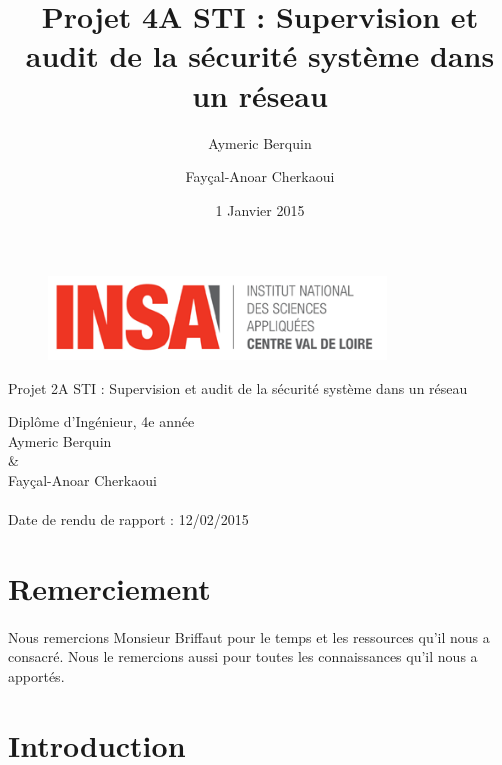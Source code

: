 \documentclass[11pt,a4paper,titlepage, oneside]{article}
\title{Projet 4A STI : Supervision et audit de la sécurité système dans un réseau}
\author{Aymeric Berquin \and Fayçal-Anoar Cherkaoui}
\date{1 Janvier 2015}
\begin{document}
\begin{titlepage}
 \thispagestyle{empty}
\begin{figure}[h]
  \centering
  \includegraphics[width=0.8\textwidth,natwidth=610,natheight=642]{images/logo.png}
\end{figure}
\vspace{0,5cm}
\begin{center} 
\Huge{\textbf{{\color{red}}}Projet 2A STI : Supervision et audit de la sécurité système dans un réseau}
\\
\vspace{1.5 cm}

\vspace{1cm}
\large{Diplôme d'Ingénieur, 4e année}
\\
\vspace{1cm}
\large{Aymeric Berquin \\ \& \\ Fayçal-Anoar Cherkaoui}
\vspace{1 cm}
\paragraph{}
	\Large{Date de rendu de rapport : 12/02/2015}
	\\
	
\vspace{1.5 cm}
\end{center} 
\end{titlepage} 
\normalsize
\newpage
\section*{\textbf{Remerciement}}
\thispagestyle{empty}
	\paragraph{}
	Nous remercions Monsieur Briffaut pour le temps et les ressources qu'il nous a consacré. Nous le remercions aussi pour toutes les connaissances qu'il nous a apportés.

\newpage
\section*{{\color{red}Introduction}}
\end{document}
